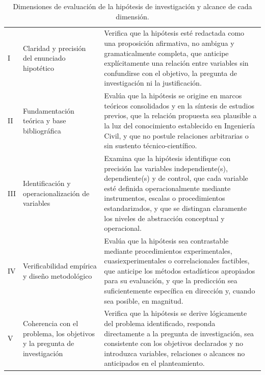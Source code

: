 \begin{table}[htbp]
\centering
\scriptsize
\caption{Dimensiones de evaluación de la hipótesis de investigación y alcance de cada dimensión.}
\label{tab:dim-hipotesis}
\begin{tabularx}{\textwidth}{|C{0.8cm}|L{4.5cm}|X|}
\hline
{}
 &  &  \\ \hline
I & Claridad y precisión del enunciado hipotético & Verifica que la hipótesis esté redactada como una proposición afirmativa, no ambigua y gramaticalmente completa, que anticipe explícitamente una relación entre variables sin confundirse con el objetivo, la pregunta de investigación ni la justificación. \\ \hline
{}
II & Fundamentación teórica y base bibliográfica & Evalúa que la hipótesis se origine en marcos teóricos consolidados y en la síntesis de estudios previos, que la relación propuesta sea plausible a la luz del conocimiento establecido en Ingeniería Civil, y que no postule relaciones arbitrarias o sin sustento técnico-científico. \\ \hline
III & Identificación y operacionalización de variables & Examina que la hipótesis identifique con precisión las variables independiente(s), dependiente(s) y de control, que cada variable esté definida operacionalmente mediante instrumentos, escalas o procedimientos estandarizados, y que se distingan claramente los niveles de abstracción conceptual y operacional. \\ \hline
{}
IV & Verificabilidad empírica y diseño metodológico & Evalúa que la hipótesis sea contrastable mediante procedimientos experimentales, cuasiexperimentales o correlacionales factibles, que anticipe los métodos estadísticos apropiados para su evaluación, y que la predicción sea suficientemente específica en dirección y, cuando sea posible, en magnitud. \\ \hline
V & Coherencia con el problema, los objetivos y la pregunta de investigación & Verifica que la hipótesis se derive lógicamente del problema identificado, responda directamente a la pregunta de investigación, sea consistente con los objetivos declarados y no introduzca variables, relaciones o alcances no anticipados en el planteamiento. \\ \hline
\end{tabularx}
\end{table}

